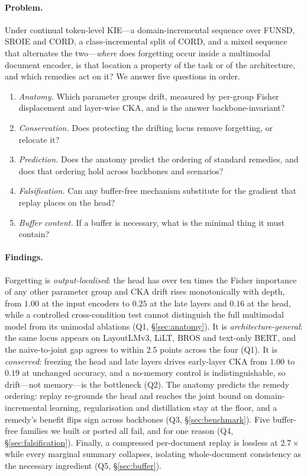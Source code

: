 \documentclass{article}
\begin{document}
\paragraph{Problem.} Under continual token-level KIE---a domain-incremental sequence over FUNSD, SROIE and CORD, a class-incremental split of CORD, and a mixed sequence that alternates the two---\emph{where} does forgetting occur inside a multimodal document encoder, is that location a property of the task or of the architecture, and which remedies act on it? We answer five questions in order.
\begin{enumerate}
  \item[\textbf{Q1}] \emph{Anatomy.} Which parameter groups drift, measured by per-group Fisher displacement and layer-wise CKA, and is the answer backbone-invariant?
  \item[\textbf{Q2}] \emph{Conservation.} Does protecting the drifting locus remove forgetting, or relocate it?
  \item[\textbf{Q3}] \emph{Prediction.} Does the anatomy predict the ordering of standard remedies, and does that ordering hold across backbones and scenarios?
  \item[\textbf{Q4}] \emph{Falsification.} Can any buffer-free mechanism substitute for the gradient that replay places on the head?
  \item[\textbf{Q5}] \emph{Buffer content.} If a buffer is necessary, what is the minimal thing it must contain?
\end{enumerate}

\paragraph{Findings.} Forgetting is \emph{output-localised}: the head has over ten times the Fisher importance of any other parameter group and CKA drift rises monotonically with depth, from $1.00$ at the input encoders to $0.25$ at the late layers and $0.16$ at the head, while a controlled cross-condition test cannot distinguish the full multimodal model from its unimodal ablations (Q1, \S\ref{sec:anatomy}). It is \emph{architecture-general}: the same locus appears on LayoutLMv3, LiLT, BROS and text-only BERT, and the naive-to-joint gap agrees to within 2.5 points across the four (Q1). It is \emph{conserved}: freezing the head and late layers drives early-layer CKA from $1.00$ to $0.19$ at unchanged accuracy, and a no-memory control is indistinguishable, so drift---not memory---is the bottleneck (Q2). The anatomy predicts the remedy ordering: replay re-grounds the head and reaches the joint bound on domain-incremental learning, regularisation and distillation stay at the floor, and a remedy's benefit flips sign across backbones (Q3, \S\ref{sec:benchmark}). Five buffer-free families we built or ported all fail, and for one reason (Q4, \S\ref{sec:falsification}). Finally, a compressed per-document replay is lossless at $2.7\times$ while every marginal summary collapses, isolating whole-document consistency as the necessary ingredient (Q5, \S\ref{sec:buffer}).
\end{document}
